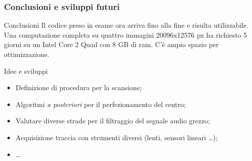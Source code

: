\begin{frame}
\frametitle{Conclusioni e sviluppi futuri}
\begin{block}{Conclusioni}
Il codice preso in esame ora arriva fino alla fine e risulta utilizzabile.
Una computazione completa su quattro immagini 20096x12576 px ha richiesto 5 giorni su 
un Intel Core 2 Quad con 8 GB di ram. C'\`e ampio spazio per ottimizzazione.
\end{block}

\begin{block}{Idee e sviluppi}
\begin{itemize}
\item Definizione di procedura per la scansione;
\item Algoritmi \emph{a posteriori} per il perfezionamento del centro;
\item Valutare diverse strade per il filtraggio del segnale audio grezzo;
\item Acquisizione traccia con strumenti diversi (lenti, sensori lineari \dots);
\item \dots
\end{itemize}
\end{block}

\end{frame}
